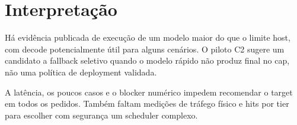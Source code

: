 \section{Interpretação}
Há evidência publicada de execução de um modelo maior do que o limite host, com decode potencialmente útil para alguns cenários. O piloto C2 sugere um candidato a fallback seletivo quando o modelo rápido não produz final no cap, não uma política de deployment validada. 

A latência, os poucos casos e o blocker numérico impedem recomendar o target em todos os pedidos. Também faltam medições de tráfego físico e hits por tier para escolher com segurança um scheduler complexo. 
